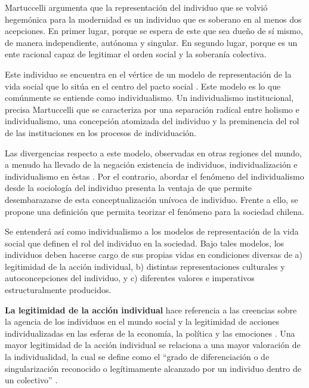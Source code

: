 \documentclass[12pt,twoside]{templates/facsothesis}
\begin{document}
Martuccelli \citeyearpar{martuccelli2010} argumenta que la representación del individuo que se volvió hegemónica para la modernidad es un individuo que es soberano en al menos dos acepciones. En primer lugar, porque se espera de este que sea dueño de sí mismo, de manera independiente, autónoma y singular. En segundo lugar, porque es un ente racional capaz de legitimar el orden social y la soberanía colectiva.

Este individuo se encuentra en el vértice de un modelo de representación de la vida social que lo sitúa en el centro del pacto social \citep{martuccelli2010, martuccelli2018}. Este modelo es lo que comúnmente se entiende como individualismo. Un individualismo institucional, precisa Martuccelli \citeyearpar{martuccelli2018} que se caracteriza por una separación radical entre holismo e individualismo, una concepción atomizada del individuo y la preminencia del rol de las instituciones en los procesos de individuación.

Las divergencias respecto a este modelo, observadas en otras regiones del mundo, a menudo ha llevado de la negación existencia de individuos, individualización e individualismo en éstas \citep{martuccelli2010}. Por el contrario, abordar el fenómeno del individualismo desde la sociología del individuo presenta la ventaja de que permite desembarazarse de esta conceptualización unívoca de individuo. Frente a ello, se propone una definición que permita teorizar el fenómeno para la sociedad chilena.

Se entenderá así como individualismo a los modelos de representación de la vida social que definen el rol del individuo en la sociedad. Bajo tales modelos, los individuos deben hacerse cargo de sus propias vidas en condiciones diversas de a) legitimidad de la acción individual, b) distintas representaciones culturales y autoconcepciones del individuo, y c) diferentes valores e imperativos estructuralmente producidos.

\textbf{La legitimidad de la acción individual} hace referencia a las creencias sobre la agencia de los individuos en el mundo social \citep{brewer2007} y la legitimidad de acciones individualizadas en las esferas de la economía, la política y las emociones \citep{cortois2018}. Una mayor legitimidad de la acción individual se relaciona a una mayor valoración de la individualidad, la cual se define como el ``grado de diferenciación o de singularización reconocido o legítimamente alcanzado por un individuo dentro de un colectivo'' \citep[p.~10]{martuccelli2018}.
\end{document}
